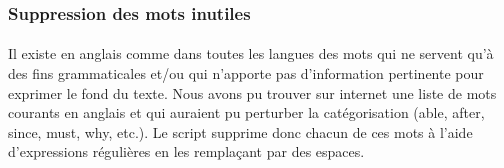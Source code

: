 \subsubsection{Suppression des mots inutiles}
\paragraph{}
Il existe en anglais comme dans toutes les langues des mots qui ne servent qu'à des fins grammaticales et/ou qui n'apporte pas d'information pertinente pour exprimer le fond du texte. Nous avons pu trouver sur internet une liste de mots courants en anglais et qui auraient pu perturber la catégorisation (able, after, since, must, why, etc.). Le script supprime donc chacun de ces mots à l'aide d'expressions régulières en les remplaçant par des espaces.
